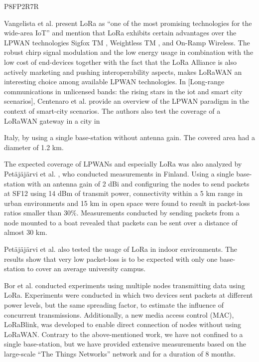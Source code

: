 \cite{blenn_lorawan_2017} P8FP2R7R


Vangelista et al.
\cite{atanasovski_long-range_2015} present LoRa as “one of the most promising technologies for the wide-area IoT” and mention that LoRa exhibits certain advantages over the LPWAN technologies Sigfox TM ,
	Weightless TM ,
	and On-Ramp Wireless.
The robust chirp signal modulation and the low energy usage in combination with the low cost of end-devices together with the fact that the LoRa Alliance is also actively marketing and pushing interoperability aspects,
	makes LoRaWAN an interesting choice among available LPWAN technologies.
In [Long-range communications in unlicensed bands:
	the rising stars in the iot and smart city scenarios],
	Centenaro et al.
provide an overview of the LPWAN paradigm in the context of smart-city scenarios.
The authors also test the coverage of a LoRaWAN gateway in a city in

Italy,
	by using a single base-station without antenna gain.
The covered area had a diameter of 1.2 km.

The expected coverage of LPWANs and especially LoRa was also analyzed by Petäjäjärvi et al.
\cite{petajajarvi_coverage_2015},
	who conducted measurements in Finland.
Using a single base-station with an antenna gain of 2 dBi and configuring the nodes to send packets at SF12 using 14 dBm of transmit power,
	connectivity within a 5 km range in urban environments and 15 km in open space were found to result in packet-loss ratios smaller than 30\%.
Measurements conducted by sending packets from a node mounted to a boat revealed that packets can be sent over a distance of almost 30 km.

Petäjäjärvi et al.
\cite{petajajarvi_evaluation_2017} also tested the usage of LoRa in indoor environments.
The results show that very low packet-loss is to be expected with only one base-station to cover an average university campus.

Bor et al.
\cite{bor_lora_nodate} conducted experiments using multiple nodes transmitting data using LoRa.
Experiments were conducted in which two devices sent packets at different power levels,
	but the same spreading factor,
	to estimate the influence of concurrent transmissions.
Additionally,
	a new media access control (MAC),
	LoRaBlink,
	was developed to enable direct connection of nodes without using LoRaWAN.
Contrary to the above-mentioned work,
	we have not confined to a single base-station,
	but we have provided extensive measurements based on the large-scale “The Things Networks” network and for a duration of 8 months.

